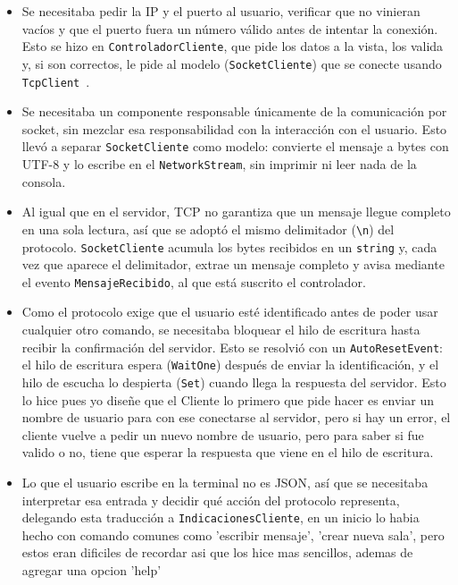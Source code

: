\documentclass{article}
\begin{document}
\begin{itemize}
    \item Se necesitaba pedir la IP y el puerto al usuario, verificar que no
    vinieran vacíos y que el puerto fuera un número válido antes de intentar
    la conexión. Esto se hizo en \texttt{ControladorCliente}, que pide los
    datos a la vista, los valida y, si son correctos, le pide al modelo
    (\texttt{SocketCliente}) que se conecte usando \texttt{TcpClient}~\cite{tcpclient}.

    \item Se necesitaba un componente responsable únicamente de la
    comunicación por socket, sin mezclar esa responsabilidad con la
    interacción con el usuario. Esto llevó a separar \texttt{SocketCliente}
    como modelo: convierte el mensaje a bytes con UTF-8 y lo escribe en el
    \texttt{NetworkStream}, sin imprimir ni leer nada de la consola.

    \item Al igual que en el servidor, TCP no garantiza que un mensaje llegue
    completo en una sola lectura, así que se adoptó el mismo delimitador
    (\texttt{\textbackslash n}) del protocolo. \texttt{SocketCliente} acumula
    los bytes recibidos en un \texttt{string} y, cada vez que aparece el
    delimitador, extrae un mensaje completo y avisa mediante el evento
    \texttt{MensajeRecibido}, al que está suscrito el controlador.

    \item Como el protocolo exige que el usuario esté identificado antes de
    poder usar cualquier otro comando, se necesitaba bloquear el hilo de
    escritura hasta recibir la confirmación del servidor. Esto se resolvió
    con un \texttt{AutoResetEvent}: el hilo de escritura espera
    (\texttt{WaitOne}) después de enviar la identificación, y el hilo de
    escucha lo despierta (\texttt{Set}) cuando llega la respuesta del
    servidor. Esto lo hice pues yo diseñe que  el Cliente lo primero que pide hacer es enviar un nombre de usuario para con ese conectarse al servidor, pero si hay un error, el cliente vuelve a pedir un nuevo nombre de usuario, pero para saber si fue valido o no, tiene que esperar la respuesta que viene en el hilo de escritura.

    \item Lo que el usuario escribe en la terminal no es JSON, así que se
    necesitaba interpretar esa entrada y decidir qué acción del protocolo
    representa, delegando esta traducción a \texttt{IndicacionesCliente}, en un inicio lo habia hecho con comando comunes como 'escribir mensaje', 'crear nueva sala', pero estos eran dificiles de recordar asi que los hice mas sencillos, ademas de agregar una opcion 'help'


\end{itemize}
\end{document}
